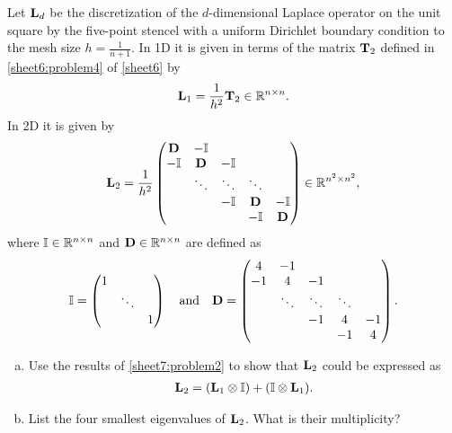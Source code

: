 \begin{Sheet}
  \begin{Problem}
    \label{sheet7:problem3}
    Let $\mathbf L_d$ be the discretization of the $d$-dimensional Laplace
    operator on the unit square by the five-point stencel with a
    uniform Dirichlet boundary condition to the mesh size
    $h=\frac1{n+1}$.  In 1D it is given in terms of the matrix
    $\mathbf T_2$ defined in \cref{sheet6:problem4} of \cref{sheet6} by
    \begin{gather*}
      \mathbf L_1 = \frac1{h^2}\mathbf T_2 \in\mathbb R^{n\times n}.
    \end{gather*}
    In 2D it is given by
    \begin{gather*}
      \mathbf L_2 = \frac1{h^2}
      \begin{pmatrix}
        \mathbf D &   -\mathbb I & & & \\
         -\mathbb I &  \mathbf D & -\mathbb I   & & \\
              & \ddots & \ddots & \ddots & \\
              &        &   -\mathbb I &  \mathbf D &   -\mathbb I\\
              &        &        &   -\mathbb I &  \mathbf D
      \end{pmatrix}
      \in\mathbb R^{n^2\times n^2},
    \end{gather*}
    where $\mathbb I\in\mathbb R^{n\times n}$ and $\mathbf D\in\mathbb R^{n\times n}$ are
    defined as
    \begin{gather*}
      \mathbb I =
      \begin{pmatrix}
        1 & & \\
          & \ddots & \\
          &        & 1
      \end{pmatrix}
      \quad\text{and}\quad
      \mathbf D =
      \begin{pmatrix}
         4 & -1 &    && \\
        -1 &  4 & -1 && \\
           & \ddots & \ddots & \ddots & \\
           &    & -1 & 4 & -1 \\
           &    &    & -1 & 4
      \end{pmatrix}.
    \end{gather*}
    \begin{enumerate}[(a)]
    \item Use the results of \cref{sheet7:problem2} to show that
      $\mathbf L_2$ could be expressed as
      \begin{gather*}
        \mathbf L_2 = (\mathbf L_1\otimes\mathbb I) + (\mathbb I\otimes \mathbf L_1).
      \end{gather*}
    \item List the four smallest eigenvalues of $\mathbf L_2$. What is
      their multiplicity?
    \end{enumerate}
  \end{Problem}


\end{Sheet}
